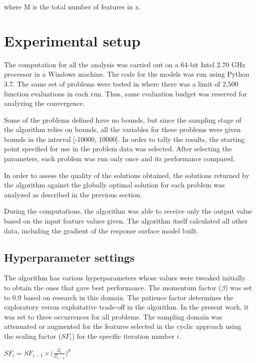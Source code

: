\noindent
where M is the total number of features in x.

\section{Experimental setup}
The computation for all the analysis was carried out on a 64-bit Intel 2.70 GHz processor in a Windows machine. The code for the models was run using Python 3.7. The same set of problems were tested in \cite{Rios2012} where there was a limit of 2,500 function evaluations in each run. Thus, same evaluation budget was reserved for analyzing the convergence.

\bigskip
\noindent
Some of the problems defined have no bounds, but since the sampling stage of the algorithm relies on bounds, all the variables for these problems were given bounds in the interval [-10000, 10000]. In order to tally the results, the starting point specified for use in the problem data was selected. After selecting the parameters, each problem was run only once and its performance compared.

\bigskip
\noindent
In order to assess the quality of the solutions obtained, the solutions returned by the algorithm against the globally optimal solution for each problem was analyzed as described in the previous section. 

\bigskip
\noindent
During the computations, the algorithm was able to receive only the output value based on the input feature values given. The algorithm itself calculated all other data, including the gradient of the response surface model built. 

\subsection{Hyperparameter settings}
The algorithm has various hyperparameters whose values were tweaked initially to obtain the ones that gave best performance. The momentum factor ($\beta$) was set to 0.9 based on research in this domain. The patience factor determines the exploratory versus exploitative trade-off in the algorithm. In the present work, it was set to three occurrences for all problems. The sampling domain was attenuated or augmented for the features selected in the cyclic approach using the scaling factor ($SF_i$) for the specific iteration number $i$. 

\begin{center}
$\displaystyle SF_i = SF_{i-1}\times \Big(\frac{Z_i}{Z_{i-1}} \Big)^p$    
\end{center}
    
